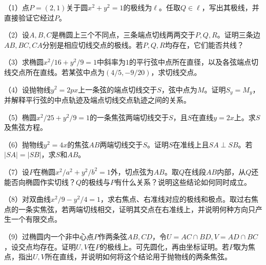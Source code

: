 \begin{exercise}
\mbox{}\par\nobreak
\begin{samepage}
（1）点\(P=(2,1)\)关于圆\(x^2+y^2=1\)的极线为\(\ell\)。任取\(Q\in\ell\)，写出其极线，并直接验证它经过\(P\)。
\par
\end{samepage}

\begin{samepage}
（2）设\(A,B,C\)是椭圆上三个不同点，三条端点切线两两交于\(P,Q,R\)。证明三条边\(AB,BC,CA\)分别是相应切线交点的极线。若\(P,Q,R\)均存在，它们能否共线？
\par
\end{samepage}

\begin{samepage}
（3）求椭圆\(x^2/16+y^2/9=1\)中斜率为\(1\)的平行弦中点所在直径，以及各弦端点切线交点所在直线。若某弦中点为\((4/5,-9/20)\)，求切线交点。
\par
\end{samepage}

\begin{samepage}
（4）设抛物线\(y^2=2px\)上一条弦的端点切线交于\(S\)，弦中点为\(M\)。证明\(S_y=M_y\)，并解释平行弦的中点轨迹及端点切线交点轨迹之间的关系。
\par
\end{samepage}

\begin{samepage}
（5）椭圆\(x^2/25+y^2/9=1\)的一条焦弦两端切线交于\(S\)，且\(S\)在直线\(y=2x\)上。求\(S\)及焦弦方程。
\par
\end{samepage}

\begin{samepage}
（6）抛物线\(y^2=4x\)的焦弦\(AB\)两端切线交于\(S\)。证明\(S\)在准线上且\(SA\perp SB\)。若\(|SA|=|SB|\)，求\(S\)和\(AB\)。
\par
\end{samepage}

\begin{samepage}
（7）设\(P\)在椭圆\(x^2/a^2+y^2/b^2=1\)外，切点弦为\(AB\)。取\(Q\)在线段\(AB\)内部，从\(Q\)还能否向椭圆作实切线？\(Q\)的极线与\(P\)有什么关系？说明这些结论如何同时成立。
\par
\end{samepage}

\begin{samepage}
（8）对双曲线\(x^2/9-y^2/4=1\)，求右焦点、右准线对应的极线和极点。取过右焦点的一条实焦弦，若两端切线相交，证明其交点在右准线上，并说明何种方向只产生一个有限交点。
\par
\end{samepage}

\begin{samepage}
（9）过椭圆内一个非中心点\(P\)作两条弦\(AB,CD\)，令\(U=AC\cap BD,V=AD\cap BC\)，设交点均存在。证明\(U,V\)在\(P\)的极线上。可先圆化，再由坐标证明。若\(P\)取为焦点，指出\(U,V\)所在直线，并说明如何将这个结论用于抛物线的两条焦弦。
\par
\end{samepage}
\end{exercise}
